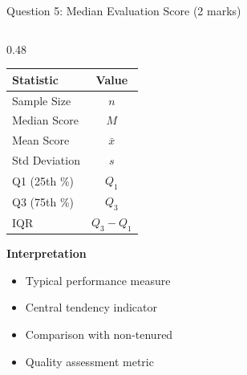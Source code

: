 \documentclass[aspectratio=169]{beamer}
\begin{document}
\begin{frame}{Question 5: Median Evaluation Score (2 marks)}
\begin{columns}[T]
\begin{column}{0.48\textwidth}
            \begin{table}[h]
                \centering
                \footnotesize
                \begin{tabular}{lc}
                    \toprule
                    \textbf{Statistic} & \textbf{Value} \\
                    \midrule
                    Sample Size & $n$ \\
                    Median Score & $M$ \\
                    Mean Score & $\bar{x}$ \\
                    Std Deviation & $s$ \\
                    Q1 (25th \%) & $Q_1$ \\
                    Q3 (75th \%) & $Q_3$ \\
                    IQR & $Q_3 - Q_1$ \\
                    \bottomrule
                \end{tabular}
            \end{table}

            \vspace{0.3cm}

            \textbf{Interpretation}
            \begin{itemize}
                \item Typical performance measure
                \item Central tendency indicator
                \item Comparison with non-tenured
                \item Quality assessment metric
            \end{itemize}
        \end{column}
    \end{columns}
\end{frame}
\end{document}
